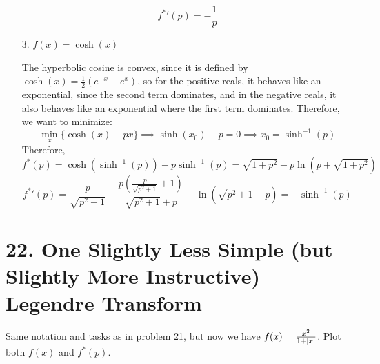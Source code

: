 \documentclass[a4paper,twoside]{article}
\begin{document}
\begin{itemize}
\begin{problem}
\begin{equation}
                {f^*}'(p) = - \frac{1}{p}
            \end{equation}
        \end{problem}
    \item[3.] $ f(x) = \cosh(x) $
        \begin{problem}
            The hyperbolic cosine is convex, since it is defined by $ \cosh(x) = \frac{1}{2} (e^{-x} + e^{x}) $, so for the positive reals, it behaves like an exponential, since the second term dominates, and in the negative reals, it also behaves like an exponential where the first term dominates. Therefore, we want to minimize:
            \begin{equation}
                \min_x \{\cosh(x) - px\} \implies \sinh(x_0) - p = 0 \implies x_0 = \sinh^{-1}(p)
            \end{equation}
            Therefore,
            \begin{equation}
                f^*(p) = \cosh(\sinh^{-1}(p)) - p\sinh^{-1}(p) = \sqrt{1+p^2} - p\ln(p + \sqrt{1+p^2})
            \end{equation}
            \begin{equation}
                {f^*}'(p) = \frac{p}{\sqrt{p^2+1}} - \frac{p \left(\frac{p}{\sqrt{p^2+1}}+1\right)}{\sqrt{p^2+1}+p}+\ln(\sqrt{p^2+1}+p) = -\sinh^{-1}(p)
            \end{equation}
        \end{problem}
\end{itemize}

\section*{22. One Slightly Less Simple (but Slightly More Instructive) Legendre Transform}
Same notation and tasks as in problem 21, but now we have $ f(x) = \frac{x^2}{1 + \abs{x}} $. Plot both $ f(x) $ and $ f^*(p) $.
\end{document}
